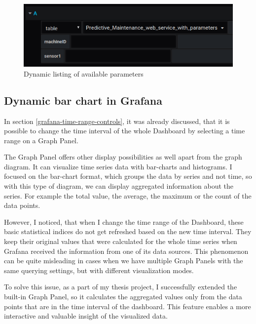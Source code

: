 \begin{figure}[h]
	\centering
	\includegraphics[width=130mm, keepaspectratio]{figures/dynamic-parameters.png}
	\caption{Dynamic listing of available parameters}
	\label{fig:dynamic-parameters}
\end{figure}

\subsection{Dynamic bar chart in Grafana} \label{dynamic-barchart}

In section \ref{grafana-time-range-controls}, it was already discussed, that it is possible to change the time interval of the whole Dashboard by selecting a time range on a Graph Panel.

The Graph Panel offers other display possibilities as well apart from the graph diagram. It can visualize time series data with bar-charts and histograms. I focused on the bar-chart format, which groups the data by series and not time, so with this type of diagram, we can display aggregated information about the series. For example the total value, the average, the maximum or the count of the data points.

However, I noticed, that when I change the time range of the Dashboard, these basic statistical indices do not get refreshed based on the new time interval. They keep their original values that were calculated for the whole time series when Grafana received the information from one of its data sources. This phenomenon can be quite misleading in cases when we have multiple Graph Panels with the same querying settings, but with different visualization modes.

To solve this issue, as a part of my thesis project, I successfully extended the built-in Graph Panel, so it calculates the aggregated values only from the data points that are in the time interval of the dashboard. This feature enables a more interactive and valuable insight of the visualized data.


